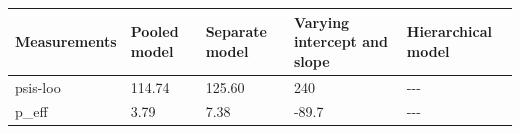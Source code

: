 \documentclass[11pt]{article}
\begin{document}
\begin{longtable}[]{@{}lllll@{}}
\toprule
\begin{minipage}[b]{0.05\columnwidth}\raggedright\strut
Measurements\strut
\end{minipage} & \begin{minipage}[b]{0.05\columnwidth}\raggedright\strut
Pooled model\strut
\end{minipage} & \begin{minipage}[b]{0.05\columnwidth}\raggedright\strut
Separate model\strut
\end{minipage} & \begin{minipage}[b]{0.05\columnwidth}\raggedright\strut
Varying intercept and slope\strut
\end{minipage} & \begin{minipage}[b]{0.05\columnwidth}\raggedright\strut
Hierarchical model\strut
\end{minipage}\tabularnewline
\midrule
\endhead
\begin{minipage}[t]{0.05\columnwidth}\raggedright\strut
psis-loo\strut
\end{minipage} & \begin{minipage}[t]{0.05\columnwidth}\raggedright\strut
114.74\strut
\end{minipage} & \begin{minipage}[t]{0.05\columnwidth}\raggedright\strut
125.60\strut
\end{minipage} & \begin{minipage}[t]{0.05\columnwidth}\raggedright\strut
240\strut
\end{minipage} & \begin{minipage}[t]{0.05\columnwidth}\raggedright\strut
-\/-\/-\strut
\end{minipage}\tabularnewline
\begin{minipage}[t]{0.05\columnwidth}\raggedright\strut
p\_eff\strut
\end{minipage} & \begin{minipage}[t]{0.05\columnwidth}\raggedright\strut
3.79\strut
\end{minipage} & \begin{minipage}[t]{0.05\columnwidth}\raggedright\strut
7.38\strut
\end{minipage} & \begin{minipage}[t]{0.05\columnwidth}\raggedright\strut
-89.7\strut
\end{minipage} & \begin{minipage}[t]{0.05\columnwidth}\raggedright\strut
-\/-\/-\strut

\end{minipage}
\end{longtable}
\end{document}
